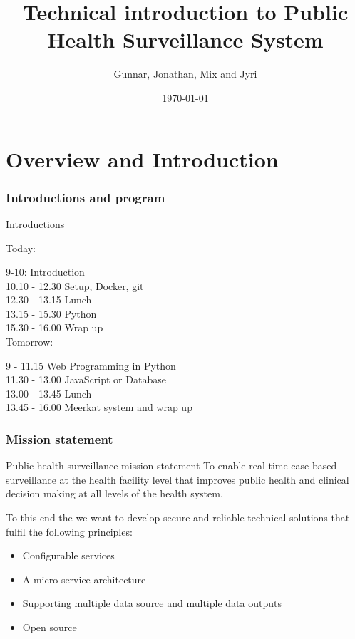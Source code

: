 \documentclass{beamer}
\title[Public Health Surveillance]{Technical introduction to Public Health Surveillance System}
\author{Gunnar, Jonathan, Mix and Jyri}
\institute[WHO]{World Health Organisation}
\date{\today}
\begin{document}
\begin{frame}
\titlepage
\end{frame}

\begin{frame}
\tableofcontents
\end{frame}

\section{Overview and Introduction}
\begin{frame}
  \frametitle{Introductions and program}
  Introductions

  \vspace{10pt}

  Today:

  9-10: Introduction \\
  10.10 - 12.30 Setup, Docker, git \\
  12.30 - 13.15 Lunch \\
  13.15 - 15.30 Python \\
  15.30 - 16.00 Wrap up \\

  Tomorrow:

  9 - 11.15 Web Programming in Python \\
  11.30 - 13.00 JavaScript or Database \\
  13.00 - 13.45 Lunch \\
  13.45 - 16.00 Meerkat system and wrap up \\
  
\end{frame}
\begin{frame}
  \frametitle{Mission statement}

  \begin{block}{Public health surveillance mission statement}
    To enable real-time case-based surveillance at the health facility level that improves public health and clinical decision making at all levels of the health system.
  \end{block}
  \vspace{10pt}
  To this end the we want to develop secure and reliable technical solutions that fulfil the following principles:

  
  \begin{itemize}
  \item Configurable services
  \item A micro-service architecture
  \item Supporting multiple data source and multiple data outputs
    \item Open source
  \end{itemize}
\end{frame}  
\end{document}
